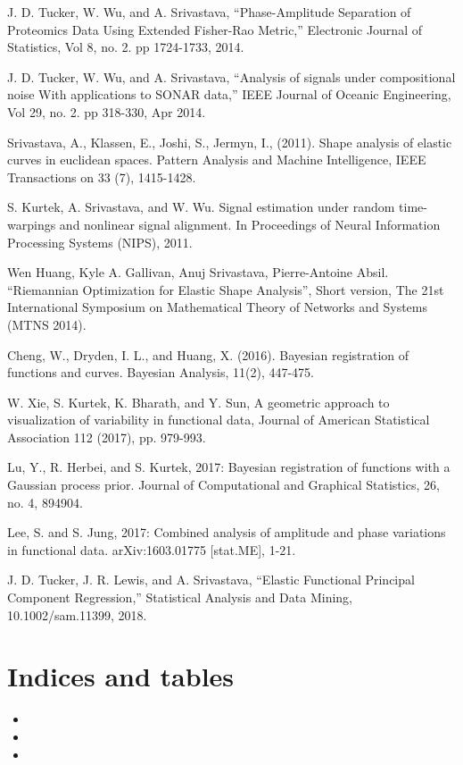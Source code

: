 \documentclass[letterpaper,10pt,english]{sphinxmanual}
\begin{document}
J. D. Tucker, W. Wu, and A. Srivastava, “Phase-Amplitude Separation of
Proteomics Data Using Extended Fisher-Rao Metric,” Electronic Journal of
Statistics, Vol 8, no. 2. pp 1724-1733, 2014.

J. D. Tucker, W. Wu, and A. Srivastava, “Analysis of signals under compositional
noise With applications to SONAR data,” IEEE Journal of Oceanic Engineering, Vol
29, no. 2. pp 318-330, Apr 2014.

Srivastava, A., Klassen, E., Joshi, S., Jermyn, I., (2011). Shape analysis of
elastic curves in euclidean spaces. Pattern Analysis and Machine Intelligence,
IEEE Transactions on 33 (7), 1415-1428.

S. Kurtek, A. Srivastava, and W. Wu. Signal estimation under random
time-warpings and nonlinear signal alignment. In Proceedings of Neural
Information Processing Systems (NIPS), 2011.

Wen Huang, Kyle A. Gallivan, Anuj Srivastava, Pierre-Antoine Absil. “Riemannian
Optimization for Elastic Shape Analysis”, Short version, The 21st International
Symposium on Mathematical Theory of Networks and Systems (MTNS 2014).

Cheng, W., Dryden, I. L., and Huang, X. (2016). Bayesian registration of functions
and curves. Bayesian Analysis, 11(2), 447-475.

W. Xie, S. Kurtek, K. Bharath, and Y. Sun, A geometric approach to visualization
of variability in functional data, Journal of American Statistical Association 112
(2017), pp. 979-993.

Lu, Y., R. Herbei, and S. Kurtek, 2017: Bayesian registration of functions with a Gaussian process prior. Journal of
Computational and Graphical Statistics, 26, no. 4, 894\textendash{}904.

Lee, S. and S. Jung, 2017: Combined analysis of amplitude and phase variations
in functional data. arXiv:1603.01775 {[}stat.ME{]}, 1-21.

J. D. Tucker, J. R. Lewis, and A. Srivastava, “Elastic Functional Principal
Component Regression,” Statistical Analysis and Data Mining, 10.1002/sam.11399, 2018.


\chapter{Indices and tables}
\label{\detokenize{index:indices-and-tables}}\begin{itemize}
\item {} 

\item {} 

\item {} 

\end{itemize}
\end{document}
